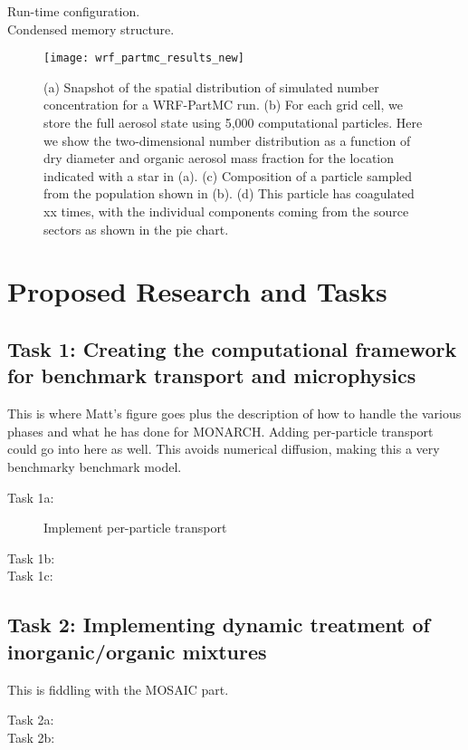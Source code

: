 \documentclass[11pt]{article}
\begin{document}
\begin{description}
\item [Run-time configuration.]

\item [Condensed memory structure.]

\end{description}


\begin{figure}
  \centering
  \texttt{[image: wrf\_partmc\_results\_new]}
  \caption{(a) Snapshot of the spatial distribution of simulated
      number concentration for a WRF-PartMC run. (b) For each grid
      cell, we store the full aerosol state using 5,000 computational
      particles. Here we show the two-dimensional number distribution
      as a function of dry diameter and organic aerosol mass fraction
      for the location indicated with a star in (a). (c) Composition
      of a particle sampled from the population shown in (b). (d) This
      particle has coagulated xx times, with the individual components
      coming from the source sectors as shown in the pie
      chart. \label{fig:wrf_partmc}}
\end{figure}

\section{Proposed Research and Tasks}
\label{sec:prop-rese-tasks}

\subsection{Task 1: Creating the computational framework for benchmark transport and microphysics}
This is where Matt's figure goes plus the description of how to handle
the various phases and what he has done for MONARCH. Adding
per-particle transport could go into here as well. This avoids
numerical diffusion, making this a very benchmarky benchmark model.

\begin{description}
\item[Task 1a:] Implement per-particle transport
\item[Task 1b:]
\item[Task 1c:]
\end{description}

\subsection{Task 2: Implementing dynamic treatment of inorganic/organic mixtures}
This is fiddling with the MOSAIC part.
\begin{description}
\item[Task 2a:]
\item[Task 2b:]
\end{description}
\end{document}
